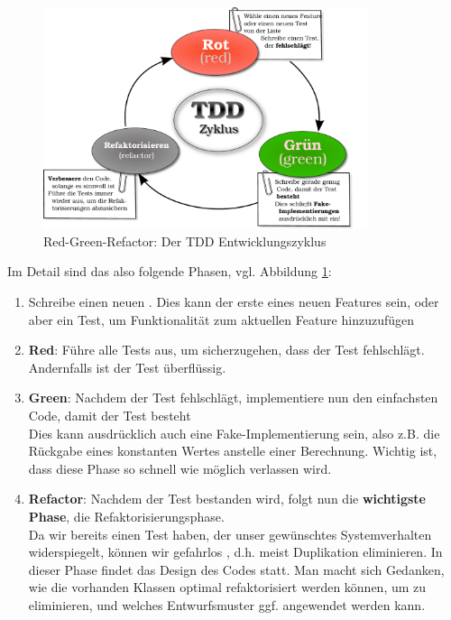   \begin{figure}[htbp]
 \centering
 \includegraphics[width=0.85\textwidth]{./diagrams/red-green-refactor.pdf}
 \caption{Red-Green-Refactor: Der TDD Entwicklungszyklus}
  \label{fig:redgreenrefactor}
\end{figure}
  Im Detail sind das also folgende Phasen, vgl. Abbildung \ref{fig:redgreenrefactor}:
  \begin{enumerate}
   \item Schreibe einen neuen . Dies kann der erste eines neuen Features sein, oder aber ein Test, um Funktionalität zum aktuellen Feature hinzuzufügen
   \item \textbf{Red}: Führe alle Tests aus, um sicherzugehen, dass der Test fehlschlägt. Andernfalls ist der Test überflüssig.
   \item \textbf{Green}: Nachdem der Test fehlschlägt, implementiere nun den einfachsten Code, damit der Test besteht\\
   Dies kann ausdrücklich auch eine Fake-Implementierung sein, also z.B. die Rückgabe eines konstanten Wertes anstelle einer Berechnung. Wichtig ist, dass diese Phase so schnell wie möglich verlassen wird.
   \item \textbf{Refactor}: Nachdem der Test bestanden wird, folgt nun die \textbf{wichtigste Phase}, die Refaktorisierungsphase.\\
   Da wir bereits einen Test haben, der unser gewünschtes Systemverhalten widerspiegelt, können wir gefahrlos , d.h. meist Duplikation eliminieren. In dieser Phase findet das Design des Codes statt. Man macht sich Gedanken, wie die vorhanden Klassen optimal refaktorisiert werden können, um  zu eliminieren, und welches Entwurfsmuster ggf. angewendet werden kann.
  \end{enumerate}
  
